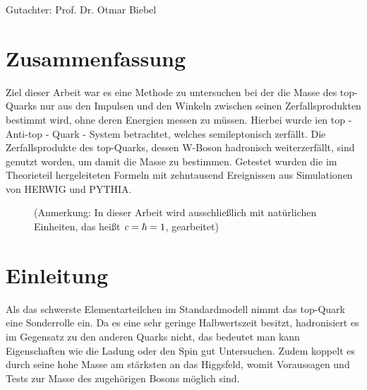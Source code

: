 \documentclass[
a4paper,                                %
twoside,                                %
BCOR1.4cm,                      %
ngerman,                                %
10pt,                           %
headings=normal,                %
headsepline,                    %
clearplainpage, %
final,                                  %
div=14,
parskip=full
]{scrbook}
\begin{document}
        \newpage
        
        \thispagestyle{empty}
        \cleardoublepage
        
        \begin{flushleft}
        \large Gutachter:  Prof. Dr. Otmar Biebel \\[1mm]
        \end{flushleft}
        
        \thispagestyle{empty}
        \cleardoublepage


\chapter*{Zusammenfassung}

Ziel dieser Arbeit war es eine Methode zu untersuchen bei der die Masse des top-Quarks nur aus den Impulsen und den Winkeln zwischen seinen Zerfallsprodukten bestimmt wird, ohne deren Energien messen zu m\"ussen. Hierbei wurde ien top - Anti-top - Quark - System betrachtet, welches semileptonisch zerf\"allt. Die Zerfallsprodukte des top-Quarks, dessen W-Boson hadronisch weiterzerf\"allt, sind genutzt worden, um damit die Masse zu bestimmen. Getestet wurden die im Theorieteil hergeleiteten Formeln mit zehntausend Ereignissen aus Simulationen von HERWIG und PYTHIA.


\begin{figure}[b]
(Anmerkung: In dieser Arbeit wird ausschlie\ss lich mit nat\"urlichen Einheiten, das hei\ss t $\textit c = \hbar = 1 $, gearbeitet)
\end{figure}

\thispagestyle{empty}

\newpage

\tableofcontents

\newpage

\chapter{Einleitung}

Als das schwerste Elementarteilchen im Standardmodell nimmt das top-Quark eine Sonderrolle ein. Da es eine sehr geringe Halbwertszeit besitzt, hadronisiert es im Gegensatz zu den anderen Quarks nicht, das bedeutet man kann Eigenschaften wie die Ladung oder den Spin gut Untersuchen. Zudem koppelt es durch seine hohe Masse am st\"arksten an das Higgsfeld, womit Voraussagen und Tests zur Masse des zugeh\"origen Bosons m\"oglich sind. 
\end{document}
